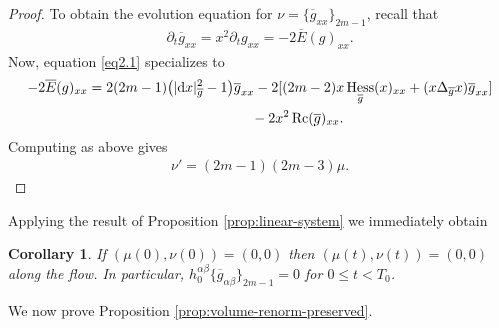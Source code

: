 \documentclass[pdftex]{sigma}
\numberwithin{equation}{section}
\newtheorem{Corollary}[Theorem]{Corollary}
\newcommand{\olg}{\overline{g}}
\newcommand{\olE}{\overline{E}}
\newcommand{\gbar}{\overline{g}}
\DeclareMathOperator{\Rc}{Rc}
\DeclareMathOperator{\hess}{Hess}
\begin{document}
\begin{proof}
To obtain the evolution equation for $\nu = \{\olg_{xx}\}_{2m-1}$, recall that
\begin{gather*}%
\partial_t \olg_{xx} = x^2 \partial_t g_{xx} = - 2 \olE( g )_{xx}.
\end{gather*}
Now, equation \eqref{eq2.1} specializes to
\begin{gather*}%
-2\olE( g )_{xx} =2(2m-1) \big(|{\rm d}x|^2_{\gbar}-1\big) \olg_{xx} -2 [ (2m-2) x\hess_{\olg} (x)_{xx} +(x\Delta_{\olg} x) \olg_{xx} ]\\
\hphantom{-2\olE( g )_{xx} =}{} -2x^2 \Rc(\gbar)_{xx} .
\end{gather*}
Computing as above gives
\begin{gather*}%
\nu' = (2m-1)(2m-3) \mu.\tag*{\qed}
\end{gather*}\renewcommand{\qed}{}
\end{proof}

Applying the result of Proposition \ref{prop:linear-system} we immediately obtain
\begin{Corollary} \label{corollary3.4}
If $(\mu(0), \nu(0)) = (0,0)$ then $(\mu(t), \nu(t)) = (0,0)$ along the flow. In particular, $h_0^{\alpha \beta} \{\gbar_{\alpha \beta}\}_{2m-1} = 0$ for $0 \leq t < T_0$.
\end{Corollary}

We now prove Proposition \ref{prop:volume-renorm-preserved}.
\end{document}
